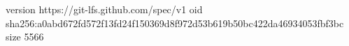 version https://git-lfs.github.com/spec/v1
oid sha256:a0abd672fd572f13fd24f150369d8f972d53b619b50bc422da46934053fbf3bc
size 5566

